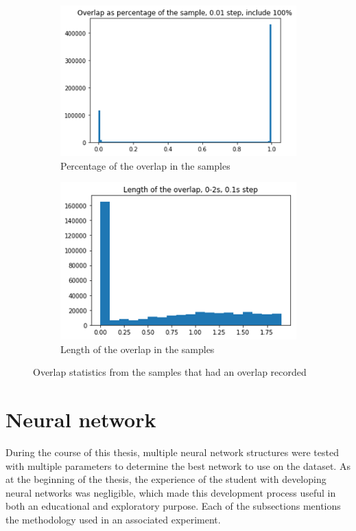 \begin{figure}
    \centering
    \begin{subfigure}[b]{.45\textwidth}
        \centering
        \includegraphics[width=\textwidth]{figures/overlap0-100.png}
        \caption{Percentage of the overlap in the samples}
        \label{sfig:overlappercent}
    \end{subfigure}
    \hfill
    \begin{subfigure}[b]{.45\textwidth}
        \centering
        \includegraphics[width=\textwidth]{figures/length0-2.png}
        \caption{Length of the overlap in the samples}
        \label{sfig:overlaplength}
    \end{subfigure}
    \caption{Overlap statistics from the samples that had an overlap recorded}
    \label{fig:overlapstats}
\end{figure}

\section{Neural network}
During the course of this thesis, multiple neural network structures were tested with multiple parameters to determine the best network to use on the dataset.
As at the beginning of the thesis, the experience of the student with developing neural networks was negligible, which made this development process useful in both an educational and exploratory purpose.
Each of the subsections mentions the methodology used in an associated experiment.

